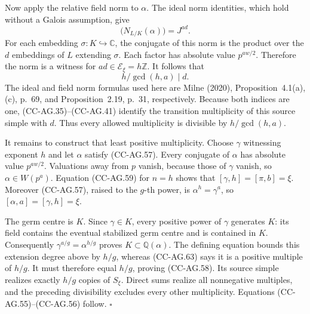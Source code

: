 Now apply the relative field norm to \(\alpha\).
The ideal norm identities, which hold without a
Galois assumption, give
\[
                  \bigl(N_{L/K}(\alpha)\bigr)=J^{ad}.
                                                               \tag{CC-AG.62}
\]
For each embedding \(\sigma:K\hookrightarrow\mathbb C\),
the conjugate of this norm is the product over the
\(d\) embeddings of \(L\) extending \(\sigma\).
Each factor has absolute value \(p^{aw/2}\).
Therefore the norm is a witness for
\(ad\in\mathscr E_\xi=h\mathbb Z\).
It follows that
\[
                           h/\gcd(h,a)\mid d.                 \tag{CC-AG.63}
\]
The ideal and field norm formulas used here are Milne
(2020), Proposition~4.1(a),(c), p.~69, and
Proposition~2.19, p.~31, respectively.
Because both indices are one, (CC-AG.35)--(CC-AG.41)
identify the transition multiplicity of this source
simple with \(d\).
Thus every allowed multiplicity is divisible by
\(h/\gcd(h,a)\).

It remains to construct that least positive
multiplicity.  Choose \(\gamma\) witnessing exponent
\(h\) and let \(\alpha\) satisfy (CC-AG.57).
Every conjugate of \(\alpha\) has absolute value
\(p^{aw/2}\).  Valuations away from \(p\) vanish,
because those of \(\gamma\) vanish, so
\(\alpha\in W(p^a)\).
Equation (CC-AG.59) for \(n=h\) shows that
\([\gamma,h]=[\pi,b]=\xi\).
Moreover (CC-AG.57), raised to the \(g\)-th power,
is \(\alpha^h=\gamma^a\), so
\([\alpha,a]=[\gamma,h]=\xi\).

The germ centre is \(K\).  Since \(\gamma\in K\),
every positive power of \(\gamma\) generates \(K\):
its field contains the eventual stabilized germ
centre and is contained in \(K\).
Consequently
\(\gamma^{a/g}=\alpha^{h/g}\) proves
\(K\subset\mathbb Q(\alpha)\).
The defining equation bounds this extension degree
above by \(h/g\), whereas (CC-AG.63) says it is a
positive multiple of \(h/g\).
It must therefore equal \(h/g\), proving
(CC-AG.58).  Its source simple realizes exactly
\(h/g\) copies of \(S_\xi\).
Direct sums realize all nonnegative multiples, and
the preceding divisibility excludes every other
multiplicity.  Equations (CC-AG.55)--(CC-AG.56)
follow. \(\square\)

